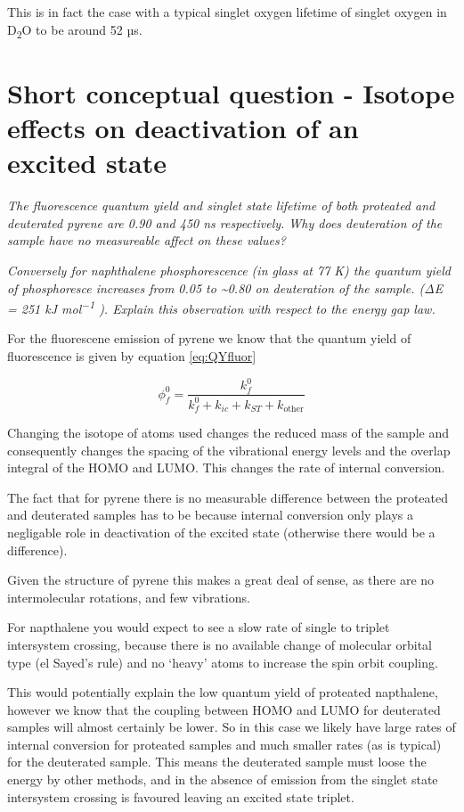 \documentclass[
]{book}
\begin{document}
This is in fact the case with a typical singlet oxygen lifetime of singlet oxygen in D\textsubscript{2}O to be around 52 µs.

\hypertarget{sec:isotope}{%
\section{Short conceptual question - Isotope effects on deactivation of an excited state}\label{sec:isotope}}

\emph{The fluorescence quantum yield and singlet state lifetime of both proteated and deuterated pyrene are 0.90 and 450 ns respectively. Why does deuteration of the sample have no measureable affect on these values?}

\emph{Conversely for naphthalene phosphorescence (in glass at 77 K) the quantum yield of phosphoresce increases from 0.05 to \textasciitilde0.80 on deuteration of the sample. (ΔE = 251 kJ mol\textsuperscript{−1} ). Explain this observation with respect to the energy gap law.}

For the fluorescene emission of pyrene we know that the quantum yield of fluorescence is given by equation \eqref{eq:QYfluor}

\begin{equation}
\phi_{f}^0 = \frac{k_{f}^0}{k_f^0+k_{ic}+ k_{ST}+k_{\textrm{other}}}
\label{eq:QYfluor}
\end{equation}

Changing the isotope of atoms used changes the reduced mass of the sample and consequently changes the spacing of the vibrational energy levels and the overlap integral of the HOMO and LUMO. This changes the rate of internal conversion.

The fact that for pyrene there is no measurable difference between the proteated and deuterated samples has to be because internal conversion only plays a negligable role in deactivation of the excited state (otherwise there would be a difference).

Given the structure of pyrene this makes a great deal of sense, as there are no intermolecular rotations, and few vibrations.

For napthalene you would expect to see a slow rate of single to triplet intersystem crossing, because there is no available change of molecular orbital type (el Sayed's rule) and no `heavy' atoms to increase the spin orbit coupling.

This would potentially explain the low quantum yield of proteated napthalene, however we know that the coupling between HOMO and LUMO for deuterated samples will almost certainly be lower. So in this case we likely have large rates of internal conversion for proteated samples and much smaller rates (as is typical) for the deuterated sample. This means the deuterated sample must loose the energy by other methods, and in the absence of emission from the singlet state intersystem crossing is favoured leaving an excited state triplet.
\end{document}
